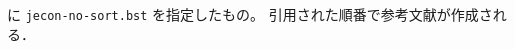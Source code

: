 \documentclass[article]{jlreq}
\begin{document}
\verb|| に \verb|jecon-no-sort.bst| を指定したもの。
引用された順番で参考文献が作成される．
\vspace*{1em}\\





\nocite{*}



%

\end{document}
